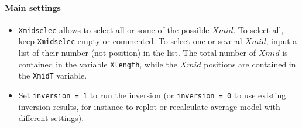 \documentclass[twoside,a4paper]{article}
\begin{document}
\paragraph{Main settings}
\begin{itemize}[leftmargin=*]
\setlength\itemsep{2ex}
\item \verb|Xmidselec| allows to select all or some of the possible $Xmid$. To select all, keep \verb|Xmidselec| empty or commented. To select one or several $Xmid$, input a list of their number (not position) in the list. The total number of $Xmid$ is contained in the variable \verb|Xlength|, while the $Xmid$ positions are contained in the \verb|XmidT| variable.

\item Set \verb|inversion = 1| to run the inversion (or \verb|inversion = 0| to use existing inversion results, for instance to replot or recalculate average model with different settings).

\end{itemize}
\end{document}

